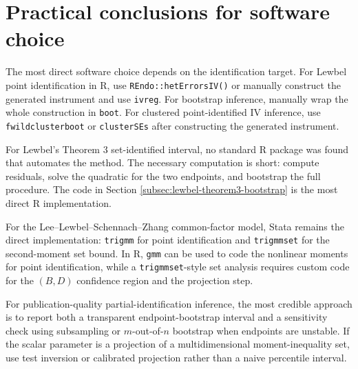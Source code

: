 \documentclass[11pt]{article}
\theoremstyle{plain}
\theoremstyle{definition}
\theoremstyle{remark}
\begin{document}
\section{Practical conclusions for software choice}
\label{sec:software-conclusions}

The most direct software choice depends on the identification target.
For Lewbel point identification in R, use \texttt{REndo::}\newline\texttt{hetErrorsIV()} or
manually construct the generated instrument and use \texttt{ivreg}.  For
bootstrap inference, manually wrap the whole construction in \texttt{boot}.  For
clustered point-identified IV inference, use \texttt{fwild}\newline\texttt{clusterboot} or
\texttt{clusterSEs} after constructing the generated instrument.

For Lewbel's Theorem 3 set-identified interval, no standard R package was found
that automates the method.  The necessary computation is short: compute
residuals, solve the quadratic for the two endpoints, and bootstrap the full
procedure.  The code in Section \ref{subsec:lewbel-theorem3-bootstrap} is the
most direct R implementation.

For the Lee--Lewbel--Schennach--Zhang common-factor model, Stata remains the
direct implementation: \texttt{trigmm} for point identification and
\texttt{trigmmset} for the second-moment set bound.  In R, \texttt{gmm} can be
used to code the nonlinear moments for point identification, while a
\texttt{trigmmset}-style set analysis requires custom code for the $(B,D)$
confidence region and the projection step.

For publication-quality partial-identification inference, the most credible
approach is to report both a transparent endpoint-bootstrap interval and a
sensitivity check using subsampling or $m$-out-of-$n$ bootstrap when endpoints
are unstable.  If the scalar parameter is a projection of a multidimensional
moment-inequality set, use test inversion or calibrated projection rather than a
naive percentile interval.
\end{document}
